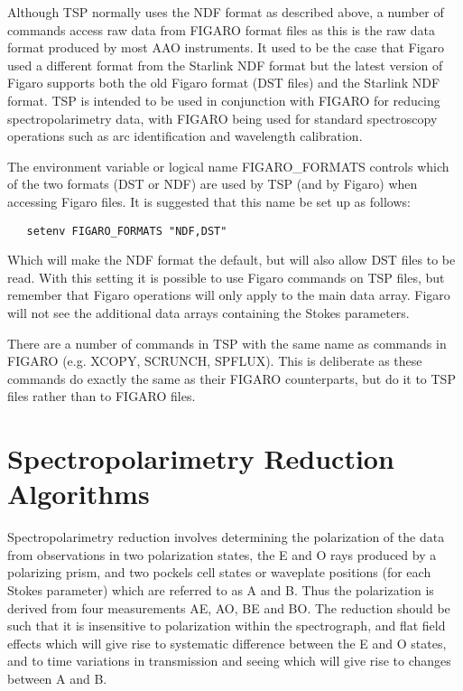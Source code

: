 Although TSP normally uses the NDF format as described above, a
number of commands access raw data from FIGARO format files as this is the
raw data format produced by most AAO instruments. It used to be the case that
Figaro used a different format from the Starlink NDF format but the latest
version of Figaro supports both the old Figaro format (DST files) and the
Starlink NDF format. TSP is intended to be used in conjunction with FIGARO for
reducing spectropolarimetry data, with FIGARO being used for standard
spectroscopy operations such as arc identification and wavelength calibration.

The environment variable or logical name FIGARO\_FORMATS controls which of the two formats (DST or NDF)
are used by TSP (and by Figaro)  when accessing Figaro files. It is suggested
that this name be set up as follows:

\begin{verbatim}
   setenv FIGARO_FORMATS "NDF,DST"
\end{verbatim}


Which will make the NDF format the default, but will also allow DST files to
be read. With this setting it is possible to use Figaro commands on TSP files,
but remember that Figaro operations will only apply to the main data array.
Figaro will not see the additional data arrays containing the Stokes
parameters.

There are a number of commands in TSP with the same name as commands in
FIGARO (e.g. XCOPY, SCRUNCH, SPFLUX). This is deliberate as these commands
do exactly the same as their FIGARO counterparts, but do it to TSP files
rather than to FIGARO files.

\section{Spectropolarimetry Reduction Algorithms}

Spectropolarimetry reduction involves determining the polarization of the
data from observations in two polarization states, the E and O rays produced by
a polarizing prism, and two pockels cell states or waveplate positions
(for each Stokes parameter) which are referred to as A and B. Thus the
polarization is derived from four measurements AE, AO, BE and BO. The reduction
should be such that it is insensitive to polarization within the spectrograph,
and flat field effects which will give rise to systematic difference between
the E and O states, and to time variations in transmission and seeing which
will give rise to changes between A and B.

